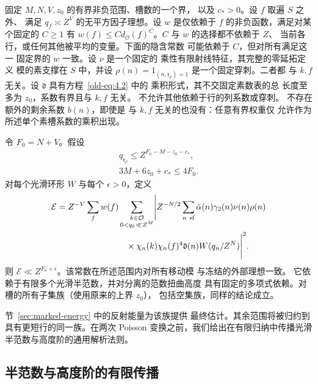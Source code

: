 \begin{lemma}[典范带标记估计]\label{lem:canonical-moment}
固定 \(M,N,V,z_0\) 的有界非负范围、槽数的一个界，
以及 \(c_*>0\)。设 \(f\) 取遍 \(S\) 之外、
满足 \(q_f\asymp Z^V\) 的无平方因子理想。设 \(w\) 是仅依赖于
\(f\) 的非负函数，满足对某个固定的
\(C\ge1\) 有 \(w(f)\le C d_{\mathcal O}(f)^C\)。\(C\) 与 \(w\) 的选择都不依赖于 \(Z\)、
当前各行，或任何其他被平均的变量。下面的隐含常数
可能依赖于 \(C\)，但对所有满足这一
固定界的 \(w\) 一致。设 \(\nu\) 是一个固定的
乘性有限射线特征，其完整的零延拓定义
模的素支撑在 \(S\) 中，并设
\(\rho(n)=1_{(n,\mathfrak r_\rho)=1}\) 是一个固定穿刺。二者都
与 \(k,f\) 无关。设 \(\mathfrak d\) 具有方程~\eqref{old-eq:4.2} 中的
乘积形式，其不交固定素数表的总
长度至多为 \(z_0\)，系数有界且与 \(k,f\) 无关。
不允许其他依赖于行的列系数或穿刺。
不存在额外的剩余系数 \(b(n)\)，即使是
与 \(k,f\) 无关的也没有：任意有界权重仅
允许作为所述单个素槽系数的乘积出现。

令 \(F_0=N+V\)。假设
\begin{equation}\label{eq:invariant}
 \begin{gathered}
 q_{\mathfrak r_\rho}\le Z^{F_0-M-z_0-c_*},\\
 3M+6z_0+c_*\le4F_0.
 \end{gathered}
\end{equation}
对每个光滑环形 \(W\) 与每个 \(\epsilon>0\)，定义
\begin{equation}\label{eq:canonical-energy}
 \begin{split}
 \mathcal E={}&Z^{-V}\sum_f w(f)
 \sum_{\substack{k\in\mathcal O\\0<q_k\ll Z^M}}
 \Biggl|Z^{-N/2}\sum_{n\ {\rm sf}}
 \bar\alpha(n)\gamma_2(n)\nu(n)\rho(n)\\
 &\hspace{24mm}\times
 \chi_n(k)\chi_n(f)^4\mathfrak d(n)W(q_n/Z^N)\Biggr|^2.
 \end{split}
\end{equation}
则 \(\mathcal E\ll Z^{F_0+\epsilon}\)。该常数在所述范围内对所有移动模
与冻结的外部理想一致。
它依赖于有限多个光滑半范数，并对分离的范数扭曲高度
具有固定的多项式依赖。对槽的所有子集族（使用原来的上界 \(z_0\)），
包括空集族，同样的结论成立。
\end{lemma}

节~\ref{sec:marked-energy} 中的反射能量为该族提供
最终估计。其余范围将被归约到
具有更短行的同一族。在两次 Poisson
变换之前，我们给出在有限归纳中传播光滑
半范数与高度阶的通用解析法则。

\subsection{半范数与高度阶的有限传播}\label{sec:moment-propagation}

